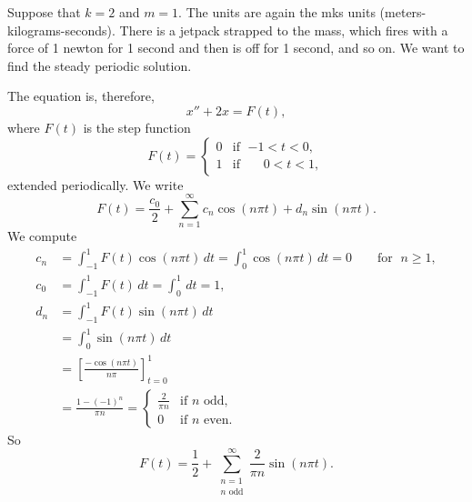 \begin{example} \label{afs:steadyex}
Suppose that $k=2$ and $m=1$.
The units are again the mks units
(meters-kilograms-seconds).
There is a jetpack strapped to the mass, which fires with a force of 1
newton for 1
second and then is off for 1 second, and so on.  We want to find the steady periodic
solution.

The equation is, therefore,
\begin{equation*}
x'' + 2 x = F(t) ,
\end{equation*}
where $F(t)$ is the step function
\begin{equation*}
F(t) =
\begin{cases}
0 & \text{if } \; {-1} < t < 0 , \\
1 & \text{if } \; \phantom{-}0 < t < 1 ,
\end{cases}
\end{equation*}
extended periodically.
We write
\begin{equation*}
F(t) = \frac{c_0}{2} + \sum_{n=1}^\infty
c_n \cos (n \pi t) +
d_n \sin (n \pi t) .
\end{equation*}
We compute
\begin{align*}
c_n & = \int_{-1}^1 F(t) \cos (n \pi t) \, dt = 
\int_{0}^1 \cos (n \pi t) \, dt = 0 \qquad \text{for } \; n \geq 1,
\\
c_0 & = \int_{-1}^1 F(t) \, dt = 
\int_{0}^1 \, dt = 1 ,
\\
d_n & = \int_{-1}^1 F(t) \sin (n \pi t) \, dt
\\
& = \int_{0}^1 \sin (n \pi t) \, dt
\\
& = \left[ \frac{-\cos (n \pi t)}{n \pi} \right]_{t=0}^1
\\
& = \frac{1-{(-1)}^n}{\pi n} =
\begin{cases}
\frac{2}{\pi n} & \text{if } n \text{ odd} , \\
0 & \text{if } n \text{ even} .
\end{cases}
\end{align*}
So
\begin{equation*}
F(t) = \frac{1}{2} + \sum_{\substack{n=1 \\ n \text{ odd}}}^\infty
\frac{2}{\pi n} \sin (n \pi t) .
\end{equation*}


\end{example}
